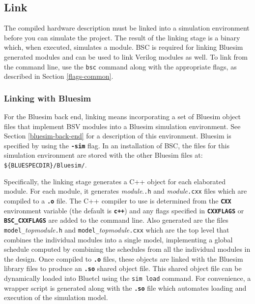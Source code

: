 \documentclass{article}
\newcommand{\te}[1]{\texttt{#1}}
\begin{document}

\subsection{Link}
\label{sec-link}

The compiled  hardware description  must be linked into a simulation
environment before you can simulate the project.  The result of the linking
stage is a binary which, when executed,
simulates a module.
BSC is required for linking  Bluesim generated modules and can
be used to link Verilog modules as well.
To link from the command line, use the \te{bsc}
command along with the appropriate flags, as described in Section \ref{flags-common}.



\subsubsection{Linking with Bluesim}

For the Bluesim back end, linking means incorporating a set of Bluesim object
files that implement BSV modules into a Bluesim simulation
environment.  See Section \ref{bluesim-back-end} for a description of this
environment.  Bluesim is specified by using the {\bf\tt -sim} flag.
In an installation of BSC, the files for
this simulation environment are stored with the other Bluesim files
at: \verb|${BLUESPECDIR}/Bluesim/|.

Specifically, the linking stage generates a C++ object for each
elaborated module.  For each module, it generates {\em module}.\te{.h} and
{\em module}\te{.cxx} files which are compiled to a {\bf\tt .o} file.
The C++ compiler to use is determined from the {\bf\tt CXX}
environment variable (the default is {\bf\tt c++}) and any flags
specified in {\bf\tt CXXFLAGS} or {\bf\tt BSC\_CXXFLAGS} are added to
the command line.
Also generated are the files \te{model\_}{\em topmodule}\te{.h} and
\te{model\_}{\em topmodule}\te{.cxx} which are the top level that combines
the individual modules into a single model,
implementing a global schedule computed by combining the schedules from
all the individual modules in the design.
Once compiled to {\bf\tt .o} files, these objects are linked with
the Bluesim library files to produce an {\bf\tt .so} shared object
file.  This shared object file can be dynamically loaded into Bluetcl
using the {\tt sim load} command.  For convenience, a wrapper script
is generated along with the {\bf\tt .so} file which automates loading
and execution of the simulation model.
\end{document}

